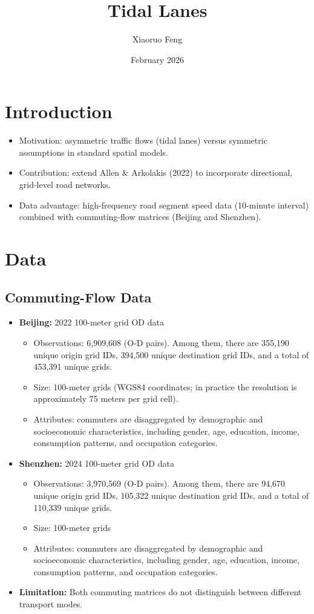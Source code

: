 \documentclass[12pt]{article}
\title{Tidal Lanes}
\author{Xiaoruo Feng}
\date{February 2026}
\begin{document}
	\maketitle
	
	\section{Introduction}
	\begin{itemize}
		\item Motivation: asymmetric traffic flows (tidal lanes) versus symmetric assumptions in standard spatial models.
		\item Contribution: extend Allen \& Arkolakis (2022) to incorporate directional, grid-level road networks.
		\item Data advantage: high-frequency road segment speed data (10-minute interval) combined with commuting-flow matrices (Beijing and Shenzhen).
	\end{itemize}
	
		\section{Data}
		\subsection{Commuting-Flow Data}
		
		\begin{itemize}
			\item \textbf{Beijing:} 2022 100-meter grid OD data
			\begin{itemize}
				\item Observations: 6,909,608 (O-D pairs). Among them, there are 355,190 unique origin grid IDs, 394,500 unique destination grid IDs, and a total of 453,391 unique grids.
				\item Size: 100-meter grids (WGS84 coordinates; in practice the resolution is approximately 75 meters per grid cell).
				\item Attributes: commuters are disaggregated by demographic and socioeconomic characteristics, including gender, age, education, income, consumption patterns, and occupation categories.
			\end{itemize}

			\item \textbf{Shenzhen:} 2024 100-meter grid OD data
			\begin{itemize}
				\item Observations: 3,970,569 (O-D pairs). Among them, there are 94,670 unique origin grid IDs, 105,322 unique destination grid IDs, and a total of 110,339 unique grids.
				\item Size: 100-meter grids
				\item Attributes: commuters are disaggregated by demographic and socioeconomic characteristics, including gender, age, education, income, consumption patterns, and occupation categories.
			\end{itemize}
				
		\item \textbf{Limitation:} Both commuting matrices do not distinguish between different transport modes.
	\end{itemize}
\end{document}

